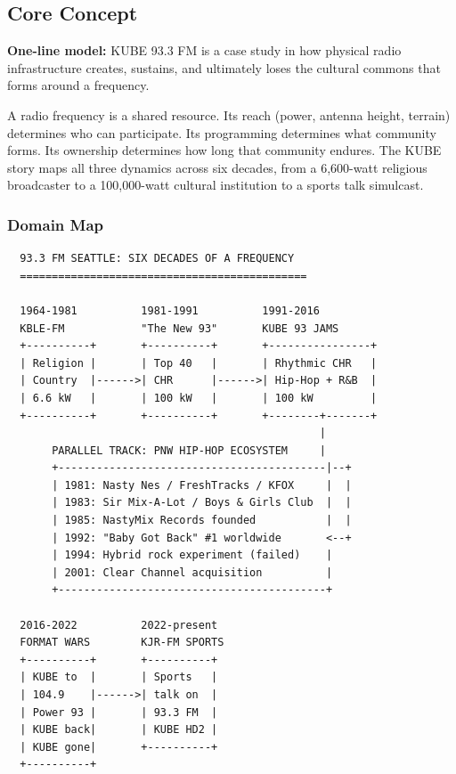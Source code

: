 \documentclass[11pt,letterpaper]{article}
\begin{document}
\subsection{Core Concept}

\begin{quotebox}
\textbf{One-line model:} KUBE 93.3 FM is a case study in how physical radio infrastructure creates, sustains, and ultimately loses the cultural commons that forms around a frequency.
\end{quotebox}

A radio frequency is a shared resource. Its reach (power, antenna height, terrain) determines who can participate. Its programming determines what community forms. Its ownership determines how long that community endures. The KUBE story maps all three dynamics across six decades, from a 6,600-watt religious broadcaster to a 100,000-watt cultural institution to a sports talk simulcast.

\subsubsection{Domain Map}

\begin{asciibox}
\begin{verbatim}
  93.3 FM SEATTLE: SIX DECADES OF A FREQUENCY
  =============================================

  1964-1981          1981-1991          1991-2016
  KBLE-FM            "The New 93"       KUBE 93 JAMS
  +----------+       +----------+       +----------------+
  | Religion |       | Top 40   |       | Rhythmic CHR   |
  | Country  |------>| CHR      |------>| Hip-Hop + R&B  |
  | 6.6 kW   |       | 100 kW   |       | 100 kW         |
  +----------+       +----------+       +--------+-------+
                                                 |
       PARALLEL TRACK: PNW HIP-HOP ECOSYSTEM     |
       +------------------------------------------|--+
       | 1981: Nasty Nes / FreshTracks / KFOX     |  |
       | 1983: Sir Mix-A-Lot / Boys & Girls Club  |  |
       | 1985: NastyMix Records founded           |  |
       | 1992: "Baby Got Back" #1 worldwide       <--+
       | 1994: Hybrid rock experiment (failed)    |
       | 2001: Clear Channel acquisition          |
       +------------------------------------------+

  2016-2022          2022-present
  FORMAT WARS        KJR-FM SPORTS
  +----------+       +----------+
  | KUBE to  |       | Sports   |
  | 104.9    |------>| talk on  |
  | Power 93 |       | 93.3 FM  |
  | KUBE back|       | KUBE HD2 |
  | KUBE gone|       +----------+
  +----------+
\end{verbatim}
\end{asciibox}
\end{document}
